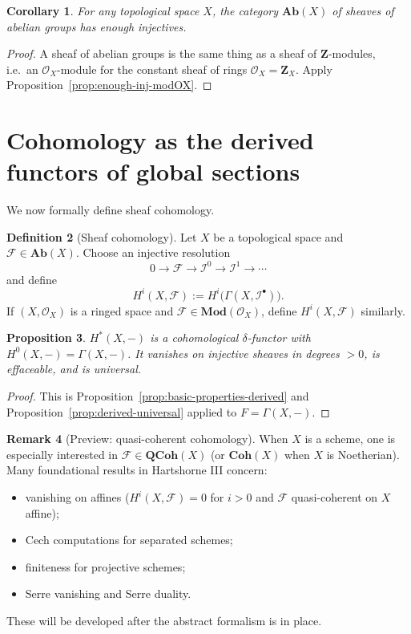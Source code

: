 \documentclass[11pt]{article}
\theoremstyle{definition}
\newtheorem{definition}{Definition}[section]
\newtheorem{remark}[definition]{Remark}
\theoremstyle{plain}
\newtheorem{proposition}[definition]{Proposition}
\newtheorem{corollary}[definition]{Corollary}
\newcommand{\Ab}{\mathbf{Ab}}
\newcommand{\Mod}{\mathbf{Mod}}
\newcommand{\QCoh}{\mathbf{QCoh}}
\newcommand{\Coh}{\mathbf{Coh}}
\newcommand{\OO}{\mathcal{O}}
\newcommand{\ZZ}{\mathbf{Z}}
\begin{document}
\begin{corollary}\label{cor:enough-inj-AbX}
For any topological space $X$, the category $\Ab(X)$ of sheaves of abelian groups has enough injectives.
\end{corollary}

\begin{proof}
A sheaf of abelian groups is the same thing as a sheaf of $\ZZ$-modules, i.e.\ an $\OO_X$-module for the constant sheaf of rings $\OO_X=\ZZ_X$. Apply Proposition~\ref{prop:enough-inj-modOX}.
\end{proof}

\section{Cohomology as the derived functors of global sections}

We now formally define sheaf cohomology.

\begin{definition}[Sheaf cohomology]\label{def:sheaf-cohomology}
Let $X$ be a topological space and $\mathcal{F}\in\Ab(X)$. Choose an injective resolution
\[
0\to \mathcal{F}\to \mathcal{I}^0\to \mathcal{I}^1\to \cdots
\]
and define
\[
H^i(X,\mathcal{F}) := H^i\bigl(\Gamma(X,\mathcal{I}^\bullet)\bigr).
\]
If $(X,\OO_X)$ is a ringed space and $\mathcal{F}\in\Mod(\OO_X)$, define $H^i(X,\mathcal{F})$ similarly.
\end{definition}

\begin{proposition}\label{prop:sheaf-cohomology-delta}
$H^\ast(X,-)$ is a cohomological $\delta$-functor with $H^0(X,-)=\Gamma(X,-)$.
It vanishes on injective sheaves in degrees $>0$, is effaceable, and is universal.
\end{proposition}

\begin{proof}
This is Proposition~\ref{prop:basic-properties-derived} and Proposition~\ref{prop:derived-universal} applied to $F=\Gamma(X,-)$.
\end{proof}

\begin{remark}[Preview: quasi-coherent cohomology]
When $X$ is a scheme, one is especially interested in $\mathcal{F}\in\QCoh(X)$ (or $\Coh(X)$ when $X$ is Noetherian). Many foundational results in Hartshorne III concern:
\begin{itemize}
\item vanishing on affines ($H^i(X,\mathcal{F})=0$ for $i>0$ and $\mathcal{F}$ quasi-coherent on $X$ affine);
\item Cech computations for separated schemes;
\item finiteness for projective schemes;
\item Serre vanishing and Serre duality.
\end{itemize}
These will be developed after the abstract formalism is in place.
\end{remark}
\end{document}
